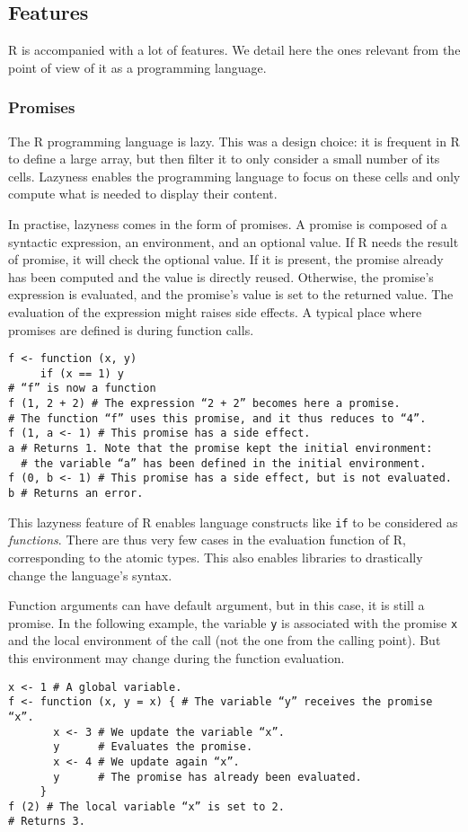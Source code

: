 \documentclass{article}
\newcommand\R{R}
\begin{document}
\subsection{Features}

\R{} is accompanied with a lot of features.
We detail here the ones relevant from the point of view
of it as a programming language.

\subsubsection{Promises}
\label{sec:promises}

The \R{} programming language is lazy.
This was a design choice:
it is frequent in \R{} to define a large array,
but then filter it to only consider a small number of its cells.
Lazyness enables the programming language to focus on these cells
and only compute what is needed to display their content.

In practise, lazyness comes in the form of promises.
A promise is composed of a syntactic expression,
an environment, and an optional value.
If \R{} needs the result of promise,
it will check the optional value.
If it is present, the promise already has been computed
and the value is directly reused.
Otherwise, the promise's expression is evaluated,
and the promise's value is set to the returned value.
The evaluation of the expression might raises side effects.
%
A typical place where promises are defined
is during function calls.
\begin{verbatim}
f <- function (x, y)
     if (x == 1) y
# “f” is now a function
f (1, 2 + 2) # The expression “2 + 2” becomes here a promise.
# The function “f” uses this promise, and it thus reduces to “4”.
f (1, a <- 1) # This promise has a side effect.
a # Returns 1. Note that the promise kept the initial environment:
  # the variable “a” has been defined in the initial environment.
f (0, b <- 1) # This promise has a side effect, but is not evaluated.
b # Returns an error.
\end{verbatim}

This lazyness feature of \R{} enables
language constructs like \texttt{if}
to be considered as \emph{functions}.
There are thus very few cases in the evaluation function
of \R{}, corresponding to the atomic types.
This also enables libraries to drastically change
the language's syntax.

Function arguments can have default argument,
but in this case, it is still a promise.
In the following example,
the variable \texttt{y} is associated with
the promise \texttt{x} and the local environment
of the call (not the one from the calling point).
But this environment may change during the function evaluation.
\begin{verbatim}
x <- 1 # A global variable.
f <- function (x, y = x) { # The variable “y” receives the promise “x”.
       x <- 3 # We update the variable “x”.
       y      # Evaluates the promise.
       x <- 4 # We update again “x”.
       y      # The promise has already been evaluated.
     }
f (2) # The local variable “x” is set to 2.
# Returns 3.
\end{verbatim}
\end{document}
